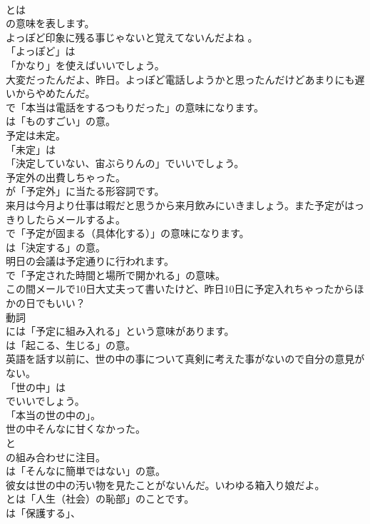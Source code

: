 \documentclass[8pt]{extreport}
\begin{document}
\begin{CJK}{UTF8}{min}
\\	とは
\\	の意味を表します。	
\\	よっぽど印象に残る事じゃないと覚えてないんだよね 。 
\\	「よっぽど」は
\\	「かなり」を使えばいいでしょう。	
\\	大変だったんだよ、昨日。よっぽど電話しようかと思ったんだけどあまりにも遅いからやめたんだ。 
\\	で「本当は電話をするつもりだった」の意味になります。
\\	は「ものすごい」の意。	
\\	予定は未定。 
\\	「未定」は
\\	「決定していない、宙ぶらりんの」でいいでしょう。	
\\	予定外の出費しちゃった。 
\\	が「予定外」に当たる形容詞です。	
\\	来月は今月より仕事は暇だと思うから来月飲みにいきましょう。また予定がはっきりしたらメールするよ。 
\\	で「予定が固まる（具体化する）」の意味になります。
\\	は「決定する」の意。	
\\	明日の会議は予定通りに行われます。 
\\	で「予定された時間と場所で開かれる」の意味。	
\\	この間メールで10日大丈夫って書いたけど、昨日10日に予定入れちゃったからほかの日でもいい？ 
\\	動詞 
\\	には「予定に組み入れる」という意味があります。
\\	は「起こる、生じる」の意。	
\\	英語を話す以前に、世の中の事について真剣に考えた事がないので自分の意見がない。 
\\	「世の中」は
\\	でいいでしょう。
\\	「本当の世の中の」。	
\\	世の中そんなに甘くなかった。 
\\	と 
\\	の組み合わせに注目。
\\	は「そんなに簡単ではない」の意。	
\\	彼女は世の中の汚い物を見たことがないんだ。いわゆる箱入り娘だよ。 
\\	とは「人生（社会）の恥部」のことです。
\\	は「保護する」、

\end{CJK}
\end{document}
